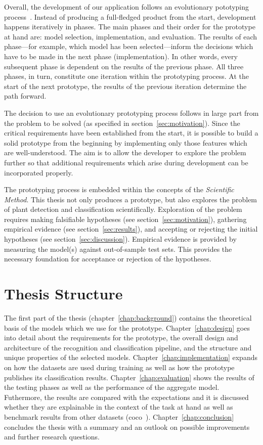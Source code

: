 \documentclass[draft,final]{vutinfth} %
\begin{document}
Overall, the development of our application follows an evolutionary
pototyping process~\cite{davis1992,sears2007}. Instead of producing a
full-fledged product from the start, development happens iteratively
in phases. The main phases and their order for the prototype at hand
are: model selection, implementation, and evaluation. The results of
each phase—for example, which model has been selected—inform the
decisions which have to be made in the next phase (implementation). In
other words, every subsequent phase is dependent on the results of the
previous phase. All three phases, in turn, constitute one iteration
within the prototyping process. At the start of the next prototype,
the results of the previous iteration determine the path forward.

The decision to use an evolutionary prototyping process follows in
large part from the problem to be solved (as specified in
section~\ref{sec:motivation}). Since the critical requirements have
been established from the start, it is possible to build a solid
prototype from the beginning by implementing only those features which
are well-understood. The aim is to allow the developer to explore the
problem further so that additional requirements which arise during
development can be incorporated properly.

The prototyping process is embedded within the concepts of the
\emph{Scientific Method}. This thesis not only produces a prototype,
but also explores the problem of plant detection and classification
scientifically. Exploration of the problem requires making falsifiable
hypotheses (see section~\ref{sec:motivation}), gathering empirical
evidence (see section~\ref{sec:results}), and accepting or rejecting
the initial hypotheses (see section~\ref{sec:discussion}). Empirical
evidence is provided by measuring the model(s) against out-of-sample
test sets. This provides the necessary foundation for acceptance or
rejection of the hypotheses.

\section{Thesis Structure}
\label{sec:structure}

The first part of the thesis (chapter~\ref{chap:background}) contains
the theoretical basis of the models which we use for the
prototype. Chapter~\ref{chap:design} goes into detail about the
requirements for the prototype, the overall design and architecture of
the recognition and classification pipeline, and the structure and
unique properties of the selected
models. Chapter~\ref{chap:implementation} expands on how the datasets
are used during training as well as how the prototype publishes its
classification results. Chapter~\ref{chap:evaluation} shows the
results of the testing phases as well as the performance of the
aggregate model. Futhermore, the results are compared with the
expectations and it is discussed whether they are explainable in the
context of the task at hand as well as benchmark results from other
datasets (\gls{coco}~\cite{lin2015}). Chapter~\ref{chap:conclusion}
concludes the thesis with a summary and an outlook on possible
improvements and further research questions.
\end{document}
